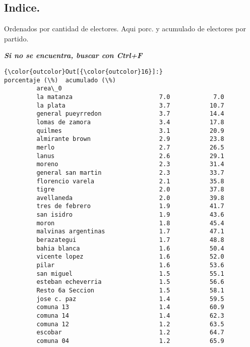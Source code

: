 \documentclass[11pt]{article}
\begin{document}
    \hypertarget{indice.}{%
\subsection{Indice.}\label{indice.}}

    
    Ordenados por cantidad de electores. Aqui porc. y acumulado de electores
por partido.

    
    \textbf{\emph{Si no se encuentra, buscar con Ctrl+F}}

    
\begin{Verbatim}[commandchars=\\\{\}]
{\color{outcolor}Out[{\color{outcolor}16}]:}                        porcentaje (\%)  acumulado (\%)
         area\_0                                              
         la matanza                        7.0            7.0
         la plata                          3.7           10.7
         general pueyrredon                3.7           14.4
         lomas de zamora                   3.4           17.8
         quilmes                           3.1           20.9
         almirante brown                   2.9           23.8
         merlo                             2.7           26.5
         lanus                             2.6           29.1
         moreno                            2.3           31.4
         general san martin                2.3           33.7
         florencio varela                  2.1           35.8
         tigre                             2.0           37.8
         avellaneda                        2.0           39.8
         tres de febrero                   1.9           41.7
         san isidro                        1.9           43.6
         moron                             1.8           45.4
         malvinas argentinas               1.7           47.1
         berazategui                       1.7           48.8
         bahia blanca                      1.6           50.4
         vicente lopez                     1.6           52.0
         pilar                             1.6           53.6
         san miguel                        1.5           55.1
         esteban echeverria                1.5           56.6
         Resto 6a Seccion                  1.5           58.1
         jose c. paz                       1.4           59.5
         comuna 13                         1.4           60.9
         comuna 14                         1.4           62.3
         comuna 12                         1.2           63.5
         escobar                           1.2           64.7
         comuna 04                         1.2           65.9

\end{Verbatim}
\end{document}
